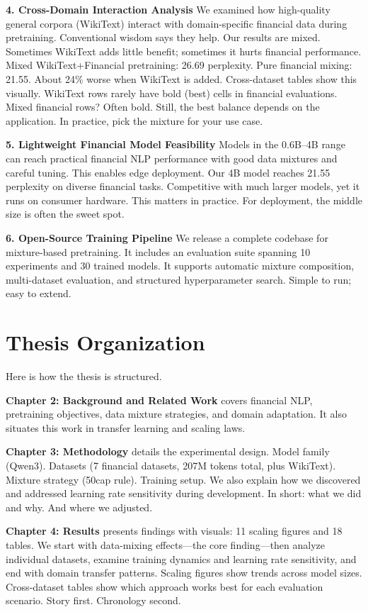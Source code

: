 \textbf{4. Cross-Domain Interaction Analysis}
We examined how high-quality general corpora (WikiText) interact with domain-specific financial data during pretraining. Conventional wisdom says they help. Our results are mixed. Sometimes WikiText adds little benefit; sometimes it hurts financial performance. Mixed WikiText+Financial pretraining: 26.69 perplexity. Pure financial mixing: 21.55. About 24\% worse when WikiText is added. Cross-dataset tables show this visually. WikiText rows rarely have bold (best) cells in financial evaluations. Mixed financial rows? Often bold. Still, the best balance depends on the application. In practice, pick the mixture for your use case.

\textbf{5. Lightweight Financial Model Feasibility}
Models in the 0.6B--4B range can reach practical financial NLP performance with good data mixtures and careful tuning. This enables edge deployment. Our 4B model reaches 21.55 perplexity on diverse financial tasks. Competitive with much larger models, yet it runs on consumer hardware. This matters in practice. For deployment, the middle size is often the sweet spot.

\textbf{6. Open-Source Training Pipeline}
We release a complete codebase for mixture-based pretraining. It includes an evaluation suite spanning 10 experiments and 30 trained models. It supports automatic mixture composition, multi-dataset evaluation, and structured hyperparameter search. Simple to run; easy to extend.

\section{Thesis Organization}

Here is how the thesis is structured.

\textbf{Chapter 2: Background and Related Work} covers financial NLP, pretraining objectives, data mixture strategies, and domain adaptation. It also situates this work in transfer learning and scaling laws.

\textbf{Chapter 3: Methodology} details the experimental design. Model family (Qwen3). Datasets (7 financial datasets, 207M tokens total, plus WikiText). Mixture strategy (50cap rule). Training setup. We also explain how we discovered and addressed learning rate sensitivity during development. In short: what we did and why. And where we adjusted.

\textbf{Chapter 4: Results} presents findings with visuals: 11 scaling figures and 18 tables. We start with data-mixing effects—the core finding—then analyze individual datasets, examine training dynamics and learning rate sensitivity, and end with domain transfer patterns. Scaling figures show trends across model sizes. Cross-dataset tables show which approach works best for each evaluation scenario. Story first. Chronology second.

